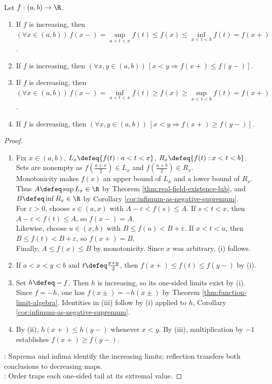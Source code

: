 \begin{theorem} \label{thm:monotone-functions-one-sided-limits} \\
Let $f:(a,b)\to\R$.
\begin{enumerate}[label=(\roman*)]
\setlength{\itemsep}{0pt}
\item If $f$ is increasing, then $(\forall x\in(a,b))\,f(x-)=\sup\limits_{a<t<x}f(t)\leq f(x)\leq\inf\limits_{x<t<b}f(t)=f(x+)$.
\item If $f$ is increasing, then $(\forall x,y\in(a,b))\,[x<y\Rightarrow f(x+)\leq f(y-)]$.
\item If $f$ is decreasing, then $(\forall x\in(a,b))\,f(x-)=\inf\limits_{a<t<x}f(t)\geq f(x)\geq\sup\limits_{x<t<b}f(t)=f(x+)$.
\item If $f$ is decreasing, then $(\forall x,y\in(a,b))\,[x<y\Rightarrow f(x+)\geq f(y-)]$.
\end{enumerate}
\begin{proof}
\begin{enumerate}[label=(\roman*)]
\setlength{\itemsep}{0pt}
\item Fix $x\in(a,b)$, $L_x\defeq\{f(t):a<t<x\}$, $R_x\defeq\{f(t):x<t<b\}$. Sets are nonempty as $f(\frac{a+x}{2})\in L_x$ and $f(\frac{x+b}{2})\in R_x$.\\
Monotonicity makes $f(x)$ an upper bound of $L_x$ and a lower bound of $R_x$.\\
Thus $A\defeq\sup L_x\in\R$ by Theorem \ref{thm:real-field-existence-lub}, and $B\defeq\inf R_x\in\R$ by Corollary \ref{cor:infimum-as-negative-supremum}.\\
For $\varepsilon>0$, choose $s\in(a,x)$ with $A-\varepsilon<f(s)\leq A$. If $s<t<x$, then $A-\varepsilon<f(t)\leq A$, so $f(x-)=A$.\\
Likewise, choose $u\in(x,b)$ with $B\leq f(u)<B+\varepsilon$. If $x<t<u$, then $B\leq f(t)<B+\varepsilon$, so $f(x+)=B$.\\
Finally, $A\leq f(x)\leq B$ by monotonicity. Since $x$ was arbitrary, (i) follows.
\item If $a<x<y<b$ and $t\defeq\frac{x+y}{2}$, then $f(x+)\leq f(t)\leq f(y-)$ by (i).
\item Set $h\defeq-f$. Then $h$ is increasing, so its one-sided limits exist by (i).\\
Since $f=-h$, one has $f(x\pm)=-h(x\pm)$ by Theorem \ref{thm:function-limit-algebra}. Identities in (iii) follow by (i) applied to $h$, Corollary \ref{cor:infimum-as-negative-supremum}.
\item By (ii), $h(x+)\leq h(y-)$ whenever $x<y$. By (iii), multiplication by $-1$ establishes $f(x+)\geq f(y-)$.
\end{enumerate}
: Suprema and infima identify the increasing limits; reflection transfers both conclusions to decreasing maps.\\
: Order traps each one-sided tail at its extremal value.
\end{proof}
\end{theorem}

